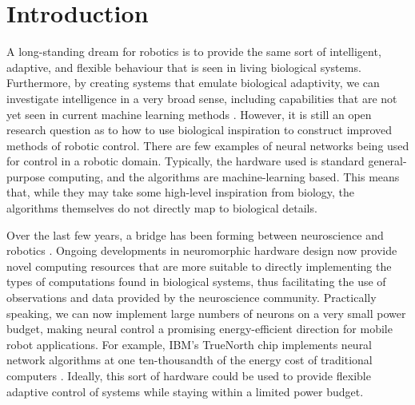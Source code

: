 \documentclass{frontiersSCNS}
\begin{document}
\section{Introduction}

A long-standing dream for robotics is to provide the same sort of
intelligent, adaptive, and flexible behaviour that is seen in living
biological systems.  Furthermore, by creating systems that emulate
biological adaptivity, we can investigate intelligence in a very broad sense,
including capabilities that are not yet seen in current machine learning
methods \citep{mcfarland1993intelligent}.  However, it is still an open
research question as to how to use biological inspiration to construct
improved methods of robotic control.  There are few examples of neural networks 
being used for control \citep{janglova2005neural} in a robotic domain. 
Typically, the hardware used is standard general-purpose computing, and the 
algorithms are machine-learning based. This means that, while they may take
some high-level inspiration from biology, the algorithms themselves do not
directly map to biological details.

Over the last few years, a bridge has been forming between neuroscience and 
robotics \citep{krichmar2011}. Ongoing developments in neuromorphic hardware 
design now provide novel computing resources that are more suitable to
directly implementing the types of computations found in biological systems, 
thus facilitating the use of observations and data provided by the 
neuroscience community. Practically speaking, we can now implement large numbers of 
neurons on a very small power budget, making neural control a promising 
energy-efficient direction for mobile robot applications.  For example,
IBM's TrueNorth chip implements neural network algorithms at one ten-thousandth
of the energy cost of traditional computers \citep{truenorth2014}.  Ideally, this 
sort of hardware could be used to provide
flexible adaptive control of systems while staying within a limited
power budget.
\end{document}

